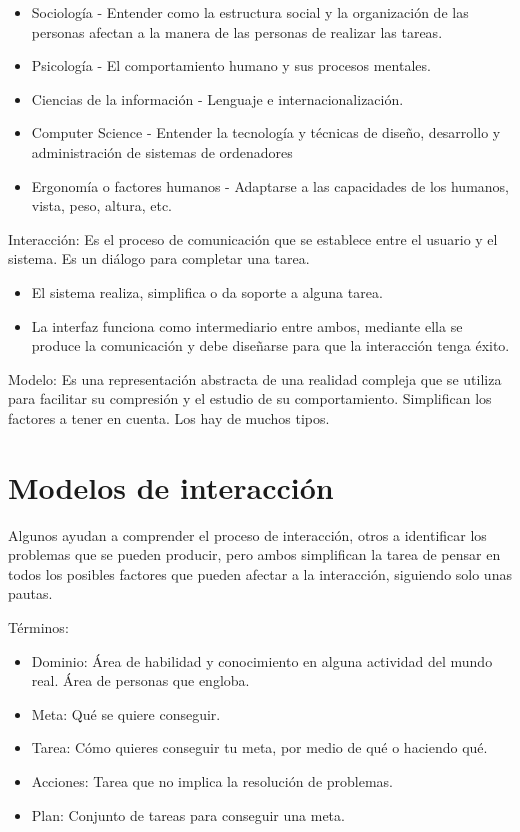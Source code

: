 \documentclass[12pt, twoside, openright]{report} %
\begin{document}
    \begin{itemize}
    
    \item
      Sociología - Entender como la estructura social y la organización
      de las personas afectan a la manera de las personas de realizar
      las tareas.
    \item
      Psicología - El comportamiento humano y sus procesos mentales.
    \item
      Ciencias de la información - Lenguaje e internacionalización.
    \item
      Computer Science - Entender la tecnología y técnicas de diseño,
      desarrollo y administración de sistemas de ordenadores
    \item
      Ergonomía o factores humanos - Adaptarse a las capacidades de los
      humanos, vista, peso, altura, etc.
    \end{itemize}

	Interacción: Es el proceso de comunicación que se establece entre el
    usuario y el sistema. Es un diálogo para completar una tarea.

    \begin{itemize}
    
    \item
      El sistema realiza, simplifica o da soporte a alguna tarea.
    \item
      La interfaz funciona como intermediario entre ambos, mediante ella
      se produce la comunicación y debe diseñarse para que la
      interacción tenga éxito.
    \end{itemize}

	Modelo: Es una representación abstracta de una realidad compleja que
    se utiliza para facilitar su compresión y el estudio de su
    comportamiento. Simplifican los factores a tener en cuenta. Los hay
    de muchos tipos.

\section{Modelos de interacción}

    Algunos ayudan a comprender el proceso de interacción, otros a
    identificar los problemas que se pueden producir, pero ambos
    simplifican la tarea de pensar en todos los posibles factores que
    pueden afectar a la interacción, siguiendo solo unas pautas.

	Términos:

    \begin{itemize}
    
    \item
      Dominio: Área de habilidad y conocimiento en alguna actividad del
      mundo real. Área de personas que engloba.
    \item
      Meta: Qué se quiere conseguir.
    \item
      Tarea: Cómo quieres conseguir tu meta, por medio de qué o haciendo
      qué.
    \item
      Acciones: Tarea que no implica la resolución de problemas.
    \item
      Plan: Conjunto de tareas para conseguir una meta.
    \end{itemize}
\end{document}
